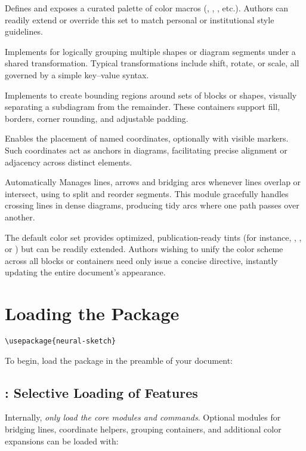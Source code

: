 \documentclass[show-experimental]{l3doc}
\begin{document}
 Defines and exposes a curated palette of color macros (, , , etc.). Authors can readily extend or override this set to match personal or institutional style guidelines.

 Implements  for logically grouping multiple shapes or diagram segments under a shared transformation. Typical transformations include shift, rotate, or scale, all governed by a simple key–value syntax.

 Implements  to create bounding regions around sets of blocks or shapes, visually separating a subdiagram from the remainder. These containers support fill, borders, corner rounding, and adjustable padding.

 Enables the placement of named coordinates, optionally with visible markers. Such coordinates act as anchors in diagrams, facilitating precise alignment or adjacency across distinct elements.

 Automatically Manages lines, arrows and bridging arcs whenever lines overlap or intersect, using  to split and reorder segments. This module gracefully handles crossing lines in dense diagrams, producing tidy arcs where one path passes over another.


The default color set provides optimized, publication-ready tints (for instance, , , or ) but can be readily extended. Authors wishing to unify the color scheme across all blocks or containers need only issue a concise  directive, instantly updating the entire document’s appearance.

\section{Loading the Package}

\begin{lstlisting}
\usepackage{neural-sketch}
\end{lstlisting}

To begin, load the package in the preamble of your document:


\subsection{: Selective Loading of Features}

Internally,  \textit{only load the core modules and commands}. Optional modules for bridging lines, coordinate helpers, grouping containers, and additional color expansions can be loaded with:
\end{document}

